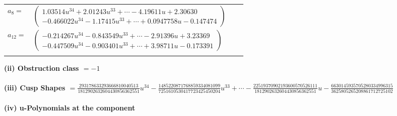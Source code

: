 \documentclass[1p]{elsarticle_modified}
\theoremstyle{definition}
\begin{document}
\begin{tabular}{m{7pt} m{180pt} m{7pt} m{180pt} }
\flushright $a_{8}=$&$\begin{pmatrix}1.03514 u^{34}+2.01243 u^{33}+\cdots-4.19611 u+2.30630\\-0.466022 u^{34}-1.17415 u^{33}+\cdots+0.0947758 u-0.147474\end{pmatrix}$ \\
\flushright $a_{12}=$&$\begin{pmatrix}-0.214267 u^{34}-0.843549 u^{33}+\cdots-2.91396 u+3.23369\\-0.447509 u^{34}-0.903401 u^{33}+\cdots+3.98711 u-0.173391\end{pmatrix}$\\&\end{tabular}
\flushleft \textbf{(ii) Obstruction class $= -1$}\\~\\
\flushleft \textbf{(iii) Cusp Shapes $= \frac{293178633293666810040513}{1812902632604430856362551} u^{34}-\frac{1485220871768859334081099}{7251610530417723425450204} u^{33}+\cdots-\frac{22519370902193600570526111}{1812902632604430856362551} u-\frac{6630145935705280334996315}{3625805265208861712725102}$}\\~\\
\newpage\renewcommand{\arraystretch}{1}
\flushleft \textbf{(iv) u-Polynomials at the component}\newline \\
\end{document}
